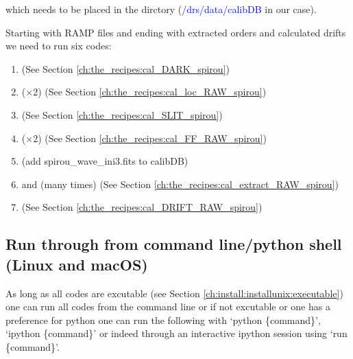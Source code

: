\noindent which needs to be placed in the  dirctory (\textcolor{blue}{/drs/data/calibDB} in our case).

\noindent Starting with RAMP files and ending with extracted orders and calculated drifts we need to run six codes:
\begin{enumerate}
\item \calDARK \hfill (See Section \ref{ch:the_recipes:cal_DARK_spirou})
\item \callocRAW ($\times$2) \hfill (See Section \ref{ch:the_recipes:cal_loc_RAW_spirou})
\item \calSLIT \hfill (See Section \ref{ch:the_recipes:cal_SLIT_spirou})
\item \calFFraw ($\times$2) \hfill (See Section \ref{ch:the_recipes:cal_FF_RAW_spirou})
\item (add spirou\_wave\_ini3.fits to calibDB) 
\item \calextractRAWAB and \calextractRAWC (many times) \hfill (See Section \ref{ch:the_recipes:cal_extract_RAW_spirou})
\item \calDRIFTRAW \hfill (See Section \ref{ch:the_recipes:cal_DRIFT_RAW_spirou})
\end{enumerate}





\subsection{Run through from command line/python shell (Linux and macOS)}
\label{chapter:using_the_drs:working_example:run_cmd}

As long as all codes are excutable (see Section \ref{ch:install:installunix:executable}) one can run all codes from the command line or if not excutable or one has a preference for python one can run the following with `python \{command\}', `ipython \{command\}' or indeed through an interactive ipython session using `run \{command\}'.

